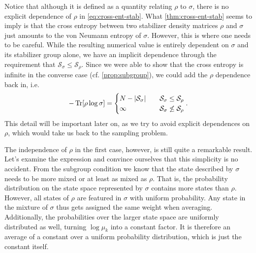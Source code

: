Notice that although it is defined as a quantity relating $\rho$ to $\sigma$,
there is no explicit dependence of $\rho$ in \cref{eq:cross-ent-stab}.
What \cref{thm:cross-ent-stab} seems to imply is that the cross entropy between two stabilizer
density matrices $\rho$ and $\sigma$ just amounts to the von Neumann entropy of
$\sigma$. However, this is where one needs to be careful. While the resulting
numerical value is entirely dependent on $\sigma$ and its stabilizer group
alone, we have an implicit dependence through the requirement that
$\mathcal{S}_\sigma \leq \mathcal{S}_\rho$. Since we were able to show that the
cross entropy is infinite in the converse case (cf. \cref{prop:subgroup}), we
could add the $\rho$ dependence back in, i.e.
\begin{align}
  -\Tr[\rho\log\sigma] = \begin{cases}
    N - \abs{\mathcal{S}_\sigma} &\quad{\mathcal{S}_\sigma \leq
    \mathcal{S}_\rho}\\
      \infty &\quad{\mathcal{S}_\sigma \not\leq \mathcal{S}_\rho}
  \end{cases}
.\end{align}
This detail will be important later on, as we try to avoid explicit
dependences on $\rho$, which would take us back to the sampling problem.

The independence of $\rho$ in the first case, however, is still quite a
remarkable result. Let's examine the expression and convince ourselves that
this simplicity is no accident.
From the subgroup condition we know that the state
described by $\sigma$ needs to be more mixed or at least as mixed as $\rho$.
That is, the probability distribution on the state space represented by $\sigma$ contains
more states than $\rho$. However, all states of $\rho$ are featured in
$\sigma$ with uniform probability. Any state in the mixture of $\sigma$ thus
gets assigned the same weight when averaging. Additionally, the probabilities
over the larger state space are uniformly distributed as well, turning $\log
\mu_k$ into a constant factor. It is therefore an average of a constant over a
uniform probability distribution, which is just the constant itself. 

%

